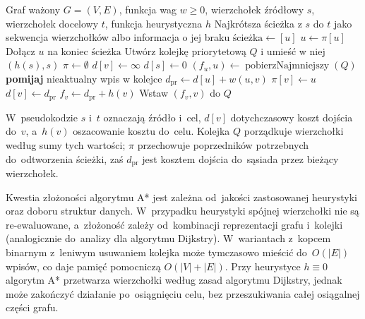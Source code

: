 \documentclass[11pt,a4paper,oneside]{report}
\begin{document}
\begin{algorithm}[H]
  \caption{Algorytm A*}
  \label{alg:a-star}
  \small
  \begin{algorithmic}[1]
    \Require Graf ważony $G=(V,E)$, funkcja wag $w\geq 0$, wierzchołek źródłowy $s$, wierzchołek docelowy $t$, funkcja heurystyczna $h$
    \Ensure Najkrótsza ścieżka z $s$ do $t$ jako sekwencja wierzchołków albo informacja o jej braku
    \Statex
      \State $\text{ścieżka}\gets [u]$
        \State $u\gets\pi[u]$
        \State Dołącz $u$ na koniec $\text{ścieżka}$
      \EndWhile
      \State {}
    \EndFunction
    \Statex
    \State Utwórz kolejkę priorytetową $Q$ i umieść w niej $(h(s), s)$
    \State $\pi\gets\emptyset$
      \State $d[v]\gets\infty$
    \EndFor
    \State $d[s]\gets 0$
      \State $(f_u, u)\gets\operatorname{pobierzNajmniejszy}(Q)$
        \State \textbf{pomijaj} nieaktualny wpis w kolejce
        \State {}
      \Else
          \State $d_{\mathrm{pr}}\gets d[u]+w(u,v)$
            \State $\pi[v]\gets u$
            \State $d[v]\gets d_{\mathrm{pr}}$
            \State $f_v\gets d_{\mathrm{pr}}+h(v)$
            \State Wstaw $(f_v, v)$ do $Q$
          \EndIf
        \EndFor
      \EndIf
    \EndWhile
    \State {}
  \end{algorithmic}
\end{algorithm}

W~pseudokodzie $s$ i~$t$ oznaczają źródło i~cel, $d[v]$ dotychczasowy koszt dojścia do~$v$, a~$h(v)$ oszacowanie kosztu do~celu. Kolejka $Q$ porządkuje wierzchołki według sumy tych wartości; $\pi$ przechowuje poprzedników potrzebnych do~odtworzenia ścieżki, zaś $d_{\mathrm{pr}}$ jest kosztem dojścia do~sąsiada przez bieżący wierzchołek.

Kwestia złożoności algorytmu A* jest zależna od~jakości zastosowanej heurystyki oraz doboru struktur danych. W~przypadku heurystyki spójnej wierzchołki nie są re-ewaluowane, a~złożoność zależy od~kombinacji reprezentacji grafu i~kolejki (analogicznie do~analizy dla algorytmu Dijkstry). W~wariantach z~kopcem binarnym z~leniwym usuwaniem kolejka może tymczasowo mieścić do~$O(|E|)$ wpisów, co daje pamięć pomocniczą $O(|V| + |E|)$. Przy heurystyce $h \equiv 0$ algorytm A* przetwarza wierzchołki według zasad algorytmu Dijkstry, jednak może zakończyć działanie po~osiągnięciu celu, bez przeszukiwania całej osiągalnej części grafu.
\end{document}
